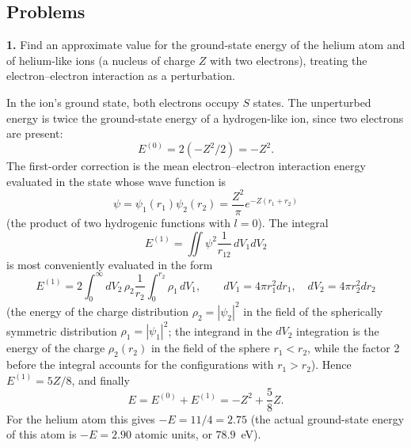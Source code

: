 \subsection*{Problems}
\ProblemHeading
\noindent\textbf{1.} Find an approximate value for the ground-state energy of the helium atom and of helium-like ions (a nucleus of charge $Z$ with two electrons), treating the electron--electron interaction as a perturbation.

\SolutionHeading In the ion's ground state, both electrons occupy $S$ states. The unperturbed energy is twice the ground-state energy of a hydrogen-like ion, since two electrons are present:
\[E^{(0)}=2(-Z^2/2)=-Z^2.\]
The first-order correction is the mean electron--electron interaction energy evaluated in the state whose wave function is
\begin{equation}
 \psi=\psi_1(r_1)\psi_2(r_2)=\frac{Z^2}{\pi}e^{-Z(r_1+r_2)}
 \tag{1}
\end{equation}
(the product of two hydrogenic functions with $l=0$). The integral
\[E^{(1)}=\iint\psi^2\frac1{r_{12}}\,dV_1dV_2\]
is most conveniently evaluated in the form
\[E^{(1)}=2\int_0^\infty dV_2\,\rho_2\frac1{r_2}\int_0^{r_2}\rho_1\,dV_1,\qquad dV_1=4\pi r_1^2dr_1,\quad dV_2=4\pi r_2^2dr_2\]
(the energy of the charge distribution $\rho_2=|\psi_2|^2$ in the field of the spherically symmetric distribution $\rho_1=|\psi_1|^2$; the integrand in the $dV_2$ integration is the energy of the charge $\rho_2(r_2)$ in the field of the sphere $r_1<r_2$, while the factor 2 before the integral accounts for the configurations with $r_1>r_2$). Hence $E^{(1)}=5Z/8$, and finally
\[E=E^{(0)}+E^{(1)}=-Z^2+\frac58Z.\]
For the helium atom this gives $-E=11/4=2.75$ (the actual ground-state energy of this atom is $-E=2.90$ atomic units, or $78.9$~eV).
